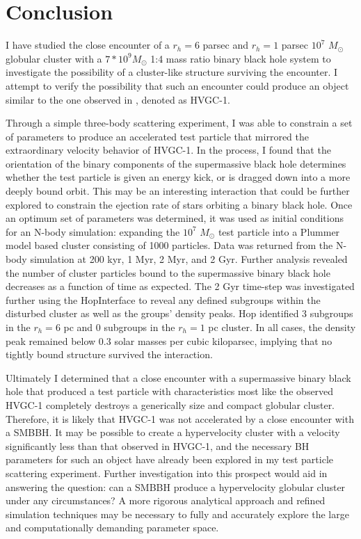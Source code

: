 \documentclass{aastex62}
\begin{document}
\section{Conclusion}
I have studied the close encounter of a $r_{h} = 6$ parsec and $r_{h} = 1$ parsec $10^7$ $M_{\odot}$ globular cluster with a $7*10^9 M_{\odot}$ 1:4 mass ratio binary black hole system to investigate the possibility of a cluster-like structure surviving the encounter. I attempt to verify the possibility that such an encounter could produce an object similar to the one observed in \citet{cald14}, denoted as HVGC-1. 

Through a simple three-body scattering experiment, I was able to constrain a set of parameters to produce an accelerated test particle that mirrored the extraordinary velocity behavior of HVGC-1. In the process, I found that the orientation of the binary components of the supermassive black hole determines whether the test particle is given an energy kick, or is dragged down into a more deeply bound orbit. This may be an interesting interaction that could be further explored to constrain the ejection rate of stars orbiting a binary black hole. Once an optimum set of parameters was determined, it was used as initial conditions for an N-body simulation: expanding the $10^7$ $M_{\odot}$ test particle into a Plummer model based cluster consisting of 1000 particles. Data was returned from the N-body simulation at 200 kyr, 1 Myr, 2 Myr, and 2 Gyr. Further analysis revealed the number of cluster particles bound to the supermassive binary black hole decreases as a function of time as expected. The 2 Gyr time-step was investigated further using the HopInterface to reveal any defined subgroups within the disturbed cluster as well as the groups' density peaks. Hop identified 3 subgroups in the $r_{h} = 6$ pc and 0 subgroups in the $r_{h} = 1$ pc cluster. In all cases, the density peak remained below $0.3$ solar masses per cubic kiloparsec, implying that no tightly bound structure survived the interaction. 

Ultimately I determined that a close encounter with a supermassive binary black hole that produced a test particle with characteristics most like the observed HVGC-1 completely destroys a generically size and compact globular cluster. Therefore, it is likely that HVGC-1 was not accelerated by a close encounter with a SMBBH. It may be possible to create a hypervelocity cluster with a velocity significantly less than that observed in HVGC-1, and the necessary BH parameters for such an object have already been explored in my test particle scattering experiment. Further investigation into this prospect would aid in answering the question: can a SMBBH produce a hypervelocity globular cluster under any circumstances? A more rigorous analytical approach and refined simulation techniques may be necessary to fully and accurately explore the large and computationally demanding parameter space.
\end{document}
